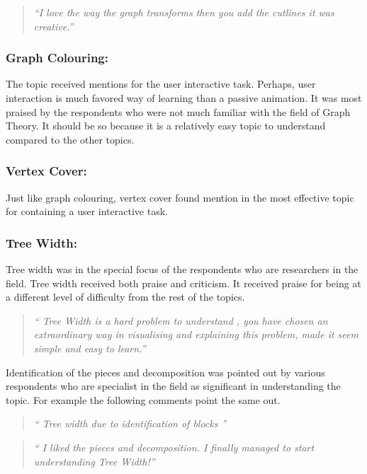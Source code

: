 \begin{quote}
\emph{``I love the way the graph transforms then you add the cutlines it was
creative.''}
\end{quote}

\subsubsection{Graph Colouring:}
The topic received mentions for the user interactive task. Perhaps, user
interaction is much favored way of learning than a passive animation.
It was most praised by the respondents who were not much familiar with
the field of Graph Theory. It should be so because it is a relatively easy
topic to understand compared to the other topics.

\subsubsection{Vertex Cover:}
Just like graph colouring, vertex cover found mention in the most effective topic for 
containing a user interactive task.

\subsubsection{Tree Width:}
Tree width was in the special focus of the respondents who are researchers in
the field.  Tree width received both praise and criticism. It received praise
for being at a different level of difficulty from the rest of the topics.

\begin{quote}
\emph{``
Tree Width is a hard problem to understand , you
have chosen an extraordinary way in visualising and explaining this
problem, made it seem simple and easy to learn.''}
\end{quote}

Identification of the pieces and decomposition was pointed out by various
respondents who are specialist in the field as significant in understanding the
topic. For example the following comments point the same out.

\begin{quote}
\emph{``
Tree width due to identification of blocks
''}
\end{quote}
\begin{quote}
\emph{``
I liked the pieces and decomposition.
I finally managed to start understanding Tree Width!''}
\end{quote}

